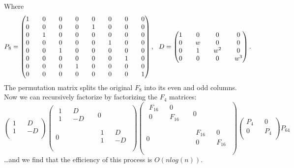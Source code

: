 \documentclass[11pt]{article}
\begin{document}
Where
$$ \setcounter{MaxMatrixCols}{16}
   P_8=
   \begin{pmatrix}
   1 &&  0 && 0 && 0  && 0 && 0 && 0 && 0 \\
   0 && 0 && 0 && 0 && 1 && 0 && 0 && 0\\ 
   0 && 1 && 0 && 0 && 0 && 0 && 0 && 0\\
   0 && 0 && 0 && 0 && 0 && 1 && 0 && 0\\
   0 && 0 && 1 && 0 && 0 && 0 && 0 && 0\\
   0 && 0 && 0 && 0 && 0 && 0 && 1 && 0\\
   0 && 0 && 0 && 1 && 0 && 0 && 0 && 0\\
   0 && 0 && 0 && 0 && 0 && 0 && 0 && 1\\
 \end{pmatrix}, \, \,\,\,
 D=
  \begin{pmatrix}
   1 &&  0 && 0 && 0   \\
   0 && w && 0 && 0 \\ 
   0 && 1 && w^2 && 0\\
   0 && 0 && 0 && w^3 \\
 \end{pmatrix}.
 $$
 The permutation matrix splits the original $F_8$ into its even and odd columns. \\
Now we can recursively factorize by factorizing the $F_4$ matrices:
$$
\begin{pmatrix}
  1 && D\\
  1 && -D\\
 \end{pmatrix}
 \begin{pmatrix}
  \begin{matrix}1 && D\\ 1 && -D\\\end{matrix} && 0\\
  0 && \begin{matrix}1 && D\\ 1 && -D\\\end{matrix}\\
 \end{pmatrix} 
  \begin{pmatrix}
  \begin{matrix}F_{16} && 0\\ 0 && F_{16}\\\end{matrix} && 0\\
  0 && \begin{matrix}F_{16} && 0\\ 0 && F_{16}\\\end{matrix}\\
 \end{pmatrix} 
  \begin{pmatrix}
  P_4 && 0\\
  0 && P_4\\
 \end{pmatrix} 
 P_{64}
$$
\dots and 
we find that the efficiency of this process is $O(n log(n))$.
\end{document}
